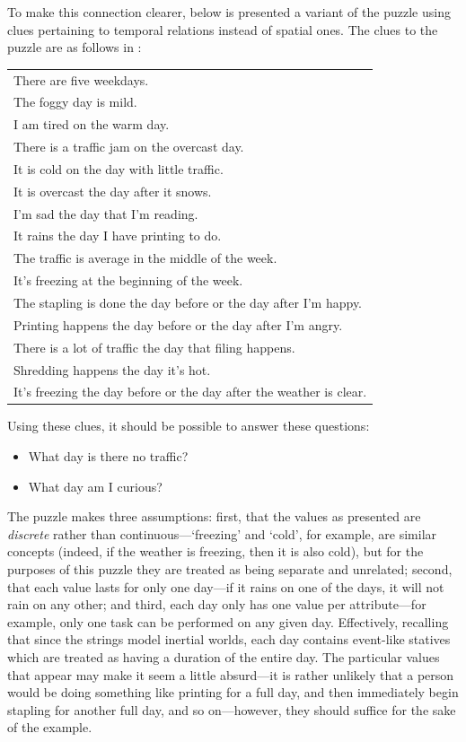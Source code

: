 \documentclass[a4paper,12pt,leqno]{article}
\begin{document}
To make this connection clearer, below is presented a variant of the puzzle using clues pertaining to temporal relations instead of spatial ones. The clues to the puzzle are as follows in :
\begin{center}
	\begin{tabular}[h!]{|l|}
		\hline
		There are five weekdays.\\
		The foggy day is mild.\\
		I am tired on the warm day.\\
		There is a traffic jam on the overcast day.\\
		It is cold on the day with little traffic.\\
		It is overcast the day after it snows.\\
		I'm sad the day that I'm reading.\\
		It rains the day I have printing to do.\\
		The traffic is average in the middle of the week.\\
		It's freezing at the beginning of the week.\\
		The stapling is done the day before or the day after I'm happy.\\
		Printing happens the day before or the day after I'm angry.\\
		There is a lot of traffic the day that filing happens.\\
		Shredding happens the day it's hot.\\
		It's freezing the day before or the day after the weather is clear.\\
		\hline
	\end{tabular}
	\label{tab:temporal-zebra-clues}
\end{center}
Using these clues, it should be possible to answer these questions:
\begin{itemize}
	\item What day is there no traffic?
	\item What day am I curious? 
\end{itemize}
The puzzle makes three assumptions: first, that the values as presented are \textit{discrete} rather than continuous---`freezing' and `cold', for example, are similar concepts (indeed, if the weather is freezing, then it is also cold), but for the purposes of this puzzle they are treated as being separate and unrelated; second, that each value lasts for only one day---if it rains on one of the days, it will not rain on any other; and third, each day only has one value per attribute---for example, only one task can be performed on any given day. Effectively, recalling that since the strings model inertial worlds, each day contains event-like statives which are treated as having a duration of the entire day. The particular values that appear may make it seem a little absurd---it is rather unlikely that a person would be doing something like printing for a full day, and then immediately begin stapling for another full day, and so on---however, they should suffice for the sake of the example.
\end{document}
